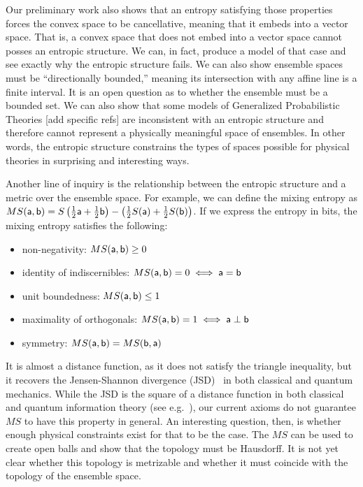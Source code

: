Our preliminary work also shows that an entropy satisfying those properties forces the convex space to be cancellative, meaning that it embeds into a vector space. That is, a convex space that does not embed into a vector space cannot posses an entropic structure. We can, in fact, produce a model of that case and see exactly why the entropic structure fails. We can also show ensemble spaces must be ``directionally bounded,'' meaning its intersection with any affine line is a finite interval. It is an open question as to whether the ensemble must be a bounded set. We can also show that some models of Generalized Probabilistic Theories [add specific refs] are inconsistent with an entropic structure and therefore cannot represent a physically meaningful space of ensembles. In other words, the entropic structure constrains the types of spaces possible for physical theories in surprising and interesting ways.

Another line of inquiry is the relationship between the entropic structure and a metric over the ensemble space. For example, we can define the mixing entropy as $MS(\ens[a], \ens[b]) = S\left(\frac{1}{2}\ens[a] + \frac{1}{2} \ens[b]\right) - \left(\frac{1}{2} S(\ens[a]) + \frac{1}{2} S(\ens[b])\right)$. If we express the entropy in bits, the mixing entropy satisfies the following:
\begin{itemize}
	\item non-negativity: $MS(\ens[a], \ens[b]) \geq 0$
	\item identity of indiscernibles: $MS(\ens[a], \ens[b]) = 0 \iff \ens[a]=\ens[b]$
	\item unit boundedness: $MS(\ens[a], \ens[b]) \leq 1$
	\item maximality of orthogonals: $MS(\ens[a], \ens[b]) = 1 \iff \ens[a] \ortho \ens[b]$
	\item symmetry: $MS(\ens[a], \ens[b]) = MS(\ens[b], \ens[a])$
\end{itemize}
It is almost a distance function, as it does not satisfy the triangle inequality, but it recovers the Jensen-Shannon divergence (JSD)~\cite{Jensen-ShannonOriginal} in both classical and quantum mechanics. While the JSD is the square of a distance function in both classical and quantum information theory (see e.g.~\cite{JSDProperties}), our current axioms do not guarantee $MS$ to have this property in general. An interesting question, then, is whether enough physical constraints exist for that to be the case. The $MS$ can be used to create open balls and show that the topology must be Hausdorff. It is not yet clear whether this topology is metrizable and whether it must coincide with the topology of the ensemble space.

